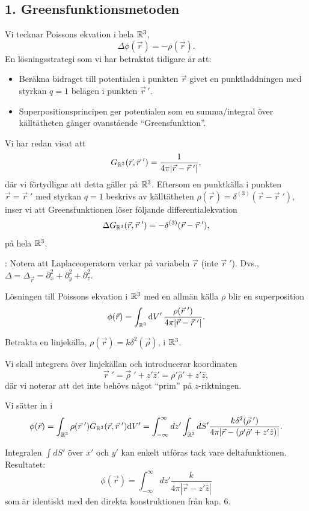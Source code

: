 \documentclass[%
oneside,                 %
final,                   %
10pt]{article}
\newcommand{\longinlinecomment}[3]{{\color{red}{\bf #1}: #2}}
\newenvironment{summary_mdfboxadmon}[1][]{
\begin{summary_mdfboxmdframed}[frametitle=#1]
}
{
\end{summary_mdfboxmdframed}
}
\begin{document}
\subsection*{1. Greensfunktionsmetoden}

Vi tecknar Poissons ekvation i hela $\Bbb{R}^3$,
$$
\Delta\phi(\vec{r})=-\rho(\vec{r}).
$$ 
En lösningsstrategi som vi har betraktat tidigare är att:
\begin{itemize}
\item Beräkna bidraget till potentialen i punkten $\vec{r}$ givet en punktladdningen med styrkan $q=1$ belägen i punkten $\vec{r}\,'$.

\item Superpositionsprincipen ger potentialen som en summa/integral över källtätheten gånger ovanstående ``Greensfunktion''.
\end{itemize}

\noindent
Vi har redan visat att
$$
G_{\Bbb{R}^3}(\vec{r},\vec{r}{\;}') = \frac{1}{4\pi|\vec{r}-\vec{r}{\;}'|},
$$
där vi förtydligar att detta gäller på $\Bbb{R}^3$. Eftersom en punktkälla i punkten $\vec{r} = \vec{r}{\;}'$ med styrkan $q=1$ beskrivs av källtätheten $\rho(\vec{r}) = \delta^{(3)}(\vec{r} - \vec{r}{\;}')$, inser vi att Greensfunktionen löser följande differentialekvation
\begin{equation}
\Delta G_{\Bbb{R}^3}(\vec{r},\vec{r}{\;}') = -\delta^{(3)}(\vec{r} - \vec{r}{\;}'),
\label{eq:Greensdiffekv}
\end{equation}
på hela $\Bbb{R}^3$.

\longinlinecomment{Kommentar 1}{ Notera att Laplaceoperatorn verkar på variabeln $\vec{r}$ (inte $\vec{r}{\;}'$). Dvs., $\Delta = \Delta_{\vec{r}} = \partial_x^2 + \partial_y^2 + \partial_z^2$. }{ Notera att Laplaceoperatorn verkar }

Lösningen till Poissons ekvation i $\Bbb{R}^3$ med en allmän källa $\rho$ blir en superposition
$$
\phi(\vec{r})=\int_{\Bbb{R}^3}\mbox{d}V'\,\frac{\rho(\vec{r}{\;}')}{4\pi|\vec{r}-\vec{r}{\;}'|}.
$$


\begin{summary_mdfboxadmon}
Betrakta en linjekälla, $\rho(\vec{r})=k\delta^2(\vec{\rho})$, i $\Bbb{R}^3$.

Vi skall integrera över linjekällan och introducerar koordinaten
$$
\vec{r}{\;}' = \vec{\rho}{\;}' + z' \hat{z}' = \rho' \hat{\rho}' + z' \hat{z},
$$
där vi noterar att det inte behövs något ``prim'' på $z$-riktningen.

Vi sätter in i 
$$
\phi(\vec{r}) = \int_{\Bbb{R}^3}\rho(\vec{r}{\;}')G_{\Bbb{R}^3}(\vec{r},\vec{r}{\;}')\mbox{d}V'
=\int_{-\infty}^{\infty}dz'\int_{\Bbb{R}^2}dS'
       \frac{k\delta^2(\vec{\rho}{\;}')}{4\pi|\vec{r}-(\rho'\hat\rho{}'+z'\hat z)|} .
$$

Integralen $\int dS'$ över $x'$ och $y'$ kan enkelt utföras tack vare deltafunktionen. Resultatet:
$$
\phi(\vec{r})=\int_{-\infty}^{\infty}dz' \frac{k}{4\pi|\vec{r}-z'\hat z|}
$$  
som är identiskt med den direkta konstruktionen från kap. 6.
\end{summary_mdfboxadmon} %
\end{document}
